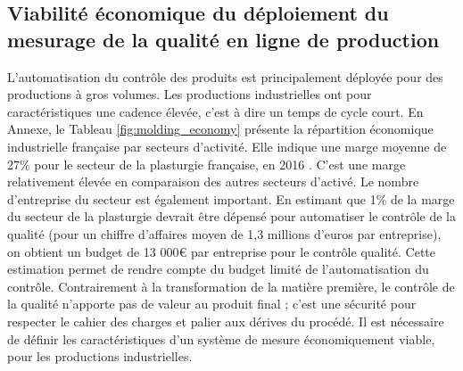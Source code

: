 \subsection{Viabilité économique du déploiement du mesurage de la qualité en ligne de production}

L'automatisation du contrôle des produits est principalement déployée pour des productions à gros volumes.
Les productions industrielles ont pour caractéristiques une cadence élevée, c'est à dire un temps de cycle court.  %
En Annexe, le Tableau \ref{fig:molding_economy} présente la répartition économique industrielle française par secteurs d'activité.
Elle indique une marge moyenne de 27\% pour le secteur de la plasturgie française, en 2016 \cite{directiongeneraledesentreprises_chiffres_2019}.
C'est une marge relativement élevée en comparaison des autres secteurs d'activé.
Le nombre d'entreprise du secteur est également important.
En estimant que 1\% de la marge du secteur de la plasturgie devrait être dépensé pour automatiser le contrôle de la qualité (pour un chiffre d'affaires moyen de 1,3 millions d'euros par entreprise), on obtient un budget de 13 000€ par entreprise pour le contrôle qualité.
Cette estimation permet de rendre compte du budget limité de l'automatisation du contrôle.
Contrairement à la transformation de la matière première, le contrôle de la qualité n'apporte pas de valeur au produit final ; c'est une sécurité pour respecter le cahier des charges et palier aux dérives du procédé.
Il est nécessaire de définir les caractéristiques d'un système de mesure économiquement viable, pour les productions industrielles.


